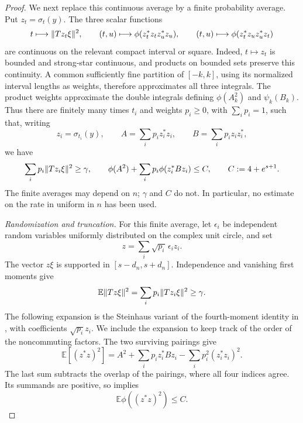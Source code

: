 \begin{proof}
We next replace this continuous average by a finite probability average.
Put $z_t=\sigma_t(y)$.  The three scalar functions
\[
 t\longmapsto\lVert Tz_t\xi\rVert^{2},\qquad
 (t,u)\longmapsto\phi(z_t^*z_tz_u^*z_u),\qquad
 (t,u)\longmapsto\phi(z_t^*z_uz_u^*z_t)
\]
are continuous on the relevant compact interval or square.  Indeed,
$t\mapsto z_t$ is bounded and strong-star continuous, and products on
bounded sets preserve this continuity.  A common sufficiently fine
partition of $[-k,k]$, using its normalized interval lengths as weights,
therefore approximates all three integrals.  The product weights
approximate the double integrals defining $\phi(A_k^2)$ and
$\psi_k(B_k)$.  Thus there are finitely many times $t_i$ and weights
$p_i\ge0$, with $\sum_i p_i=1$, such that, writing
\[
 z_i=\sigma_{t_i}(y),\qquad
 A=\sum_i p_i z_i^*z_i,\qquad
 B=\sum_i p_i z_iz_i^*,
\]
we have
\begin{equation}
\label{eq:recovery-finite}
 \sum_i p_i\lVert Tz_i\xi\rVert^{2}\ge\gamma,
 \qquad
 \phi(A^2)+\sum_i p_i\phi(z_i^*Bz_i)\le C,
 \qquad C:=4+e^{s+1}.
\end{equation}
The finite averages may depend on $n$; $\gamma$ and $C$ do not.  In
particular, no estimate on the rate in
 uniform in $n$ has been used.

\smallskip
\noindent\emph{Randomization and truncation.}
For this finite average, let $\epsilon_i$ be independent random variables
uniformly distributed on the complex unit circle, and set
\[
 z=\sum_i\sqrt{p_i}\,\epsilon_i z_i.
\]
The vector $z\xi$ is supported in $[s-d_n,s+d_n]$.  Independence and
vanishing first moments give
\[
 \mathbb E\lVert Tz\xi\rVert^{2}
   =\sum_i p_i\lVert Tz_i\xi\rVert^{2}\ge\gamma.
\]
The following expansion is the Steinhaus variant of the fourth-moment identity in
\cite[equation~(2.10) and Remark~2.8]{HaagerupMusat2007}, with
coefficients $\sqrt{p_i}z_i$. We include the expansion to keep track of
the order of the noncommuting factors. The two surviving pairings give
\begin{equation}
\label{eq:recovery-fourth}
 \mathbb E[(z^*z)^2]
  =A^2+\sum_i p_i z_i^*Bz_i
       -\sum_i p_i^2(z_i^*z_i)^2.
\end{equation}
The last sum subtracts the overlap of the pairings, where all four
indices agree.  Its summands are positive, so
 implies
\begin{equation}
\label{eq:recovery-fourth-bound}
 \mathbb E\phi((z^*z)^2)\le C.
\end{equation}


\end{proof}
